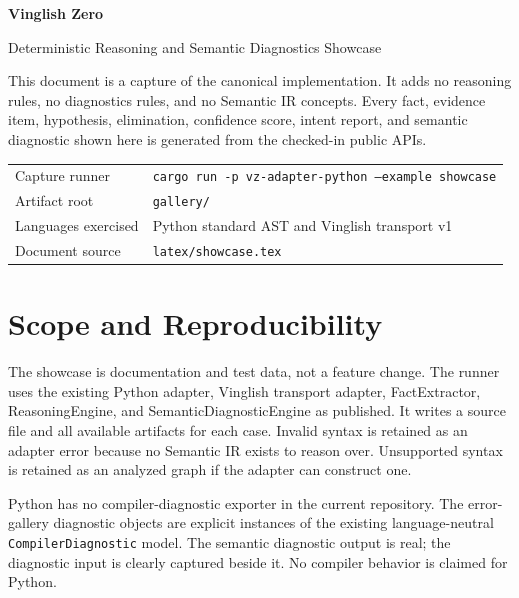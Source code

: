 \documentclass[10pt,a4paper]{article}
\begin{document}
\begin{titlepage}
\pagecolor{mist}
\color{ink}
\vspace*{28mm}
{\Huge\bfseries Vinglish Zero\\[3mm]}
{\LARGE Deterministic Reasoning and Semantic Diagnostics Showcase\par}
\vspace{12mm}
\begin{tcolorbox}[colback=mint,colframe=blue!65,boxrule=0.7pt]
This document is a capture of the canonical implementation. It adds no
reasoning rules, no diagnostics rules, and no Semantic IR concepts. Every
fact, evidence item, hypothesis, elimination, confidence score, intent report,
and semantic diagnostic shown here is generated from the checked-in public APIs.
\end{tcolorbox}
\vfill
\begin{tabular}{@{}ll@{}}
Capture runner & \texttt{cargo run -p vz-adapter-python --example showcase} \\
Artifact root & \texttt{gallery/} \\
Languages exercised & Python standard AST and Vinglish transport v1 \\
Document source & \texttt{latex/showcase.tex}
\end{tabular}
\vspace*{18mm}
\end{titlepage}
\nopagecolor
\clearpage
{}

\tableofcontents
\clearpage

\section{Scope and Reproducibility}

The showcase is documentation and test data, not a feature change. The runner
uses the existing Python adapter, Vinglish transport adapter, FactExtractor,
ReasoningEngine, and SemanticDiagnosticEngine as published. It writes a source
file and all available artifacts for each case. Invalid syntax is retained as an
adapter error because no Semantic IR exists to reason over. Unsupported syntax
is retained as an analyzed graph if the adapter can construct one.

\begin{tcolorbox}[colback=amber!38,colframe=amber!70!black,title=Diagnostic input boundary]
Python has no compiler-diagnostic exporter in the current repository. The
error-gallery diagnostic objects are explicit instances of the existing
language-neutral \texttt{CompilerDiagnostic} model. The semantic diagnostic
output is real; the diagnostic input is clearly captured beside it. No compiler
behavior is claimed for Python.
\end{tcolorbox}
\end{document}
